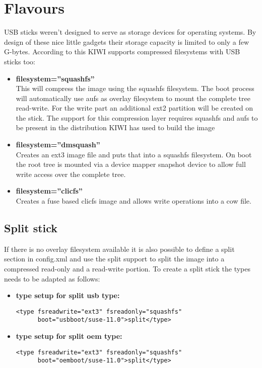 \section{Flavours}

USB sticks weren't designed to serve as storage devices for
operating systems. By design of these nice little gadgets their
storage capacity is limited to only a few G-bytes. According to
this KIWI supports compressed filesystems with USB sticks too:  

\begin{itemize}
\item \textbf{filesystem=''squashfs''}\\
      This will compress the image using the squashfs filesystem. The
      boot process will automatically use aufs as overlay filesystem to
      mount the complete tree read-write. For the write part an additional
      ext2 partition will be created on the stick. The support for this
      compression layer requires squashfs and aufs to be present in
      the distribution KIWI has used to build the image 
\item \textbf{filesystem=''dmsquash''}\\
      Creates an ext3 image file and puts that
      into a squashfs filesystem. On boot the root tree is mounted
      via a device mapper snapshot device to allow full write
      access over the complete tree.
\item \textbf{filesystem=''clicfs''}\\
      Creates a fuse based clicfs image and allows write operations
      into a cow file.
\end{itemize}

\subsection{Split stick}
If there is no overlay filesystem available it is also possible to
define a split section in config.xml and use the split support to
split the image into a compressed read-only and a read-write portion.
To create a split stick the types needs to be adapted as follows:

\begin{itemize}
\item \textbf{type setup for split usb type:}

      \begin{Command}{12cm}
      \begin{verbatim}
<type fsreadwrite="ext3" fsreadonly="squashfs"
      boot="usbboot/suse-11.0">split</type>
      \end{verbatim}
      \end{Command}
\item \textbf{type setup for split oem type:}

      \begin{Command}{12cm}
      \begin{verbatim}
<type fsreadwrite="ext3" fsreadonly="squashfs"
      boot="oemboot/suse-11.0">split</type>
      \end{verbatim}
      \end{Command}
\end{itemize}

